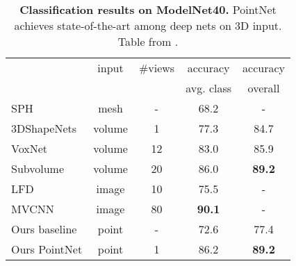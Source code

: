 \begin{table}[!ht]
    \normalsize
    \begin{tabular}{l|c|c|c|c}
        & input & \#views & accuracy & accuracy \\
        & & & avg. class & overall \\ \hline
        SPH \cite{kazhdan2003rotation} & mesh & - & 68.2 & - \\ \hline

        3DShapeNets \cite{wu20153d}     & volume & 1 & 77.3 & 84.7 \\
        VoxNet \cite{maturana2015voxnet} & volume & 12 & 83.0 & 85.9 \\
        Subvolume \cite{qi2016volumetric} & volume & 20 & 86.0 & \textbf{89.2} \\ \hline

        LFD \cite{wu20153d} & image & 10 & 75.5 & - \\
        MVCNN \cite{su2015multi} & image & 80 & \textbf{90.1} & - \\ \hline

        Ours baseline & point & - & 72.6 & 77.4 \\
        Ours PointNet & point & 1 & 86.2 & \textbf{89.2} \\
    \end{tabular}
    \caption{
        \textbf{Classification results on ModelNet40.}
        PointNet achieves state-of-the-art among deep nets on 3D input.
        Table from \cite{qi2017pointnet}.
    } \label{table:modelnet}
\end{table}
